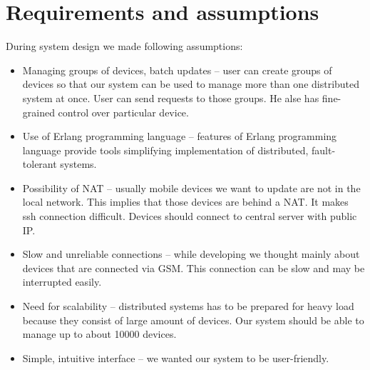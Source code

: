 \section{Requirements and assumptions}

During system design we made following assumptions:
\begin{itemize}
  \item Managing groups of devices, batch updates -- user can create groups of devices so that our system can be used to manage more than one distributed system at once. User can send requests to those groups. He alse has fine-grained control over particular device.
  \item Use of Erlang programming language -- features of Erlang programming language provide tools simplifying implementation of distributed, fault-tolerant systems.
  \item Possibility of NAT -- usually mobile devices we want to update are not in the local network. This implies that those devices are behind a NAT. It makes ssh connection difficult. Devices should connect to central server with public IP.
  \item Slow and unreliable connections -- while developing we thought mainly about devices that are connected via GSM. This connection can be slow and may be interrupted easily.
  \item Need for scalability -- distributed systems has to be prepared for heavy load because they consist of large amount of devices. Our system should be able to manage up to about 10000 devices.
  \item Simple, intuitive interface -- we wanted our system to be user-friendly.
\end{itemize}
